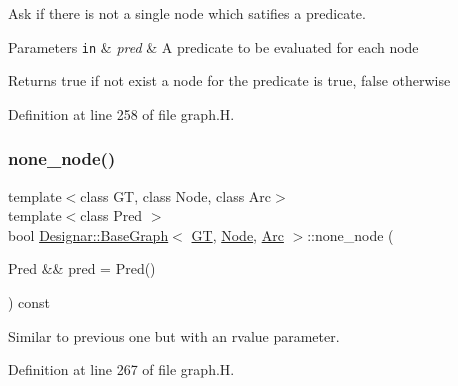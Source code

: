 Ask if there is not a single node which satifies a predicate. 


\begin{DoxyParams}[1]{Parameters}
\mbox{\tt in}  & {\em pred} & A predicate to be evaluated for each node \\
\hline
\end{DoxyParams}
\begin{DoxyReturn}{Returns}
{\ttfamily true} if not exist a node for the predicate is true, {\ttfamily false} otherwise 
\end{DoxyReturn}


Definition at line 258 of file graph.\+H.

\mbox{\label{class_designar_1_1_base_graph_a394cdb81d0b0402e348dc87d2456d2d7}} 
\subsubsection{\texorpdfstring{none\+\_\+node()}{none\_node()}\hspace{0.1cm}{\footnotesize\ttfamily [2/2]}}
{\footnotesize\ttfamily template$<$class GT, class Node, class Arc$>$ \\
template$<$class Pred $>$ \\
bool \hyperlink{class_designar_1_1_base_graph}{Designar\+::\+Base\+Graph}$<$ \hyperlink{demo-buildgraph_8_c_a3001c40d2c31ca87ed96cd7d1334a55e}{GT}, \hyperlink{namespace_designar_a5af326c65aa2bd26b26c410f2030d09e}{Node}, \hyperlink{namespace_designar_a3f55fb5513d62ff47cbc8f72b8e95d6f}{Arc} $>$\+::none\+\_\+node (\begin{DoxyParamCaption}\item[{Pred \&\&}]{pred = {\ttfamily Pred()} }\end{DoxyParamCaption}) const\hspace{0.3cm}{\ttfamily [inline]}}



Similar to previous one but with an rvalue parameter. 



Definition at line 267 of file graph.\+H.

\mbox{\label{class_designar_1_1_base_graph_a91c96135db95b2021510b769aedef850}} 
